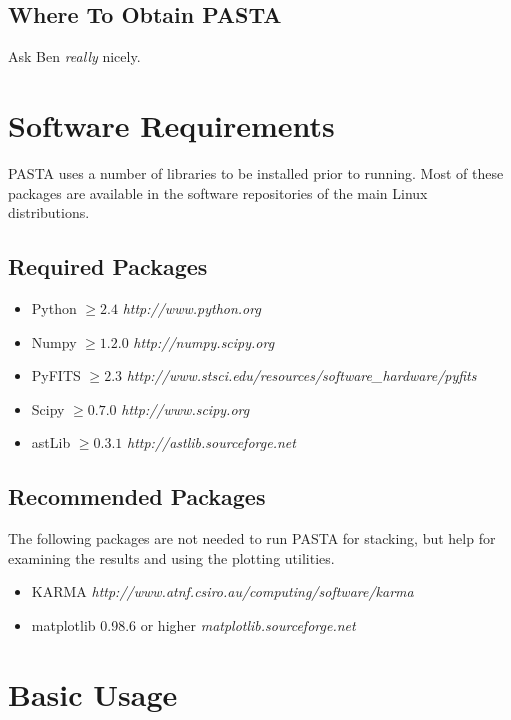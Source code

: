 \documentclass{article}
\begin{document}
\subsection{Where To Obtain PASTA}
Ask Ben \emph{really} nicely.

\section{Software Requirements}
PASTA uses a number of libraries to be installed prior to running.  Most of these
packages are available in the software repositories of the main Linux 
distributions.

\subsection{Required Packages}
\begin{itemize}
	\item Python $\ge 2.4$ \emph{http://www.python.org}
	\item Numpy $\ge 1.2.0$ \emph{http://numpy.scipy.org}
	\item PyFITS $\ge 2.3$ \emph{http://www.stsci.edu/resources/software\_hardware/pyfits}
	\item Scipy $\ge 0.7.0$ \emph{http://www.scipy.org}
	\item astLib $\ge 0.3.1$ \emph{http://astlib.sourceforge.net}
\end{itemize}

\subsection{Recommended Packages}
The following packages are not needed to run PASTA for stacking, but help for
examining the results and using the plotting utilities.
\begin{itemize}
	\item KARMA \emph{http://www.atnf.csiro.au/computing/software/karma}
	\item matplotlib 0.98.6 or higher \emph{matplotlib.sourceforge.net}
\end{itemize}

\section{Basic Usage}
\end{document}
